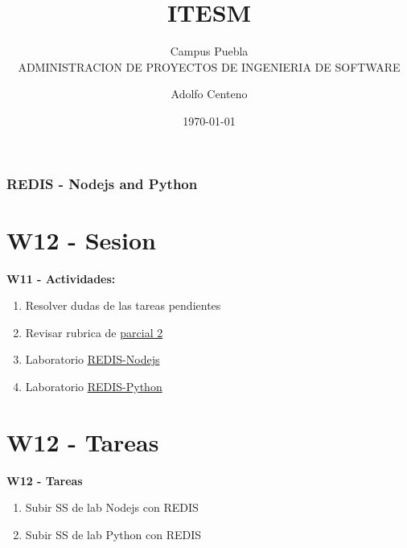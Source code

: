 \documentclass{beamer}
\begin{document}
\title{ITESM}  
\subtitle{Campus Puebla\\ADMINISTRACION DE PROYECTOS DE INGENIERIA DE SOFTWARE
}
\author{Adolfo Centeno}
\date{\today} 


\begin{frame}
\titlepage
\end{frame}

\begin{frame}\frametitle{REDIS - Nodejs and Python}
\tableofcontents
\end{frame} 


\section{W12 - Sesion }

\begin{frame}

    
\textbf{W11 - Actividades:}


\begin{enumerate}

\item
    Resolver dudas de las tareas pendientes 
\item
	Revisar rubrica de  \href{https://github.com/adsoftsito/apis/blob/master/w12/rubricaparcial2.txt}{parcial 2}

\item
   Laboratorio     
    \href{https://sodocumentation.net/es/node-js/topic/7107/nodejs-con-redis}{REDIS-Nodejs}

\item
   Laboratorio     
    \href{https://hackersandslackers.com/redis-py-python/}{REDIS-Python}
	 
\end{enumerate}

	


\end{frame}


\section{W12  - Tareas }

\begin{frame}


\textbf{W12  - Tareas}


\begin{enumerate}

\item
  Subir SS de lab Nodejs con REDIS
\item
  Subir SS de lab Python con REDIS

  	
\end{enumerate} 


\end{frame}
\end{document}
